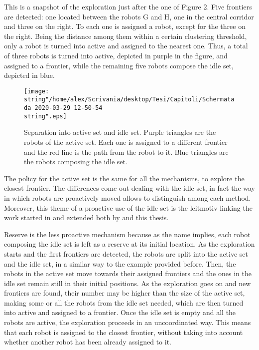 This is a snapshot of the exploration just after the one of Figure
2. Five frontiers are detected: one located between the robots G and
H, one in the central corridor and three on the right. To each one
is assigned a robot, except for the three on the right. Being the
distance among them within a certain clustering threshold, only a
robot is turned into active and assigned to the nearest one. Thus,
a total of three robots is turned into active, depicted in purple
in the figure, and assigned to a frontier, while the remaining five
robots compose the idle set, depicted in blue. 
\begin{figure}[h]
\texttt{[image: \\string"/home/alex/Scrivania/desktop/Tesi/Capitoli/Schermata da 2020-03-29 12-50-54\\string".eps]}\caption{Separation into active set and idle set. Purple triangles are the
robots of the active set. Each one is assigned to a different frontier
and the red line is the path from the robot to it. Blue triangles
are the robots composing the idle set. }
\end{figure}

The policy for the active set is the same for all the mechanisms,
to explore the closest frontier. The differences come out dealing
with the idle set, in fact the way in which robots are proactively
moved allows to distinguish among each method. Moreover, this theme
of a proactive use of the idle set is the leitmotiv linking the work
started in \cite{Rogers2013} and extended both by \cite{Cattaneo2017} and this
thesis.

Reserve is the less proactive mechanism because as the name implies,
each robot composing the idle set is left as a reserve at its initial
location. As the exploration starts and the first frontiers are detected,
the robots are split into the active set and the idle set, in a similar
way to the example provided before. Then, the robots in the active
set move towards their assigned frontiers and the ones in the idle
set remain still in their initial positions. As the exploration goes
on and new frontiers are found, their number may be higher than the
size of the active set, making some or all the robots from the idle
set needed, which are then turned into active and assigned to a frontier.
Once the idle set is empty and all the robots are active, the exploration
proceeds in an uncoordinated way. This means that each robot is assigned
to the closest frontier, without taking into account whether another
robot has been already assigned to it.

